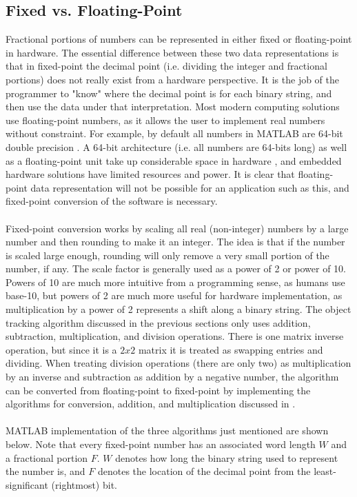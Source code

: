 \documentclass[12pt]{article} %
\begin{document}
\subsection{Fixed vs. Floating-Point}
Fractional portions of numbers can be represented in either fixed or floating-point in hardware. The essential difference between these two data representations is that in fixed-point the decimal point (i.e. dividing the integer and fractional portions) does not really exist from a hardware perspective. It is the job of the programmer to "know" where the decimal point is for each binary string, and then use the data under that interpretation. Most modern computing solutions use floating-point numbers, as it allows the user to implement real numbers without constraint. For example, by default all numbers in MATLAB are 64-bit double precision \cite{10}. A 64-bit architecture (i.e. all numbers are 64-bits long) as well as a floating-point unit take up considerable space in hardware \cite{10}, and embedded hardware solutions have limited resources and power. It is clear that floating-point data representation will not be possible for an application such as this, and fixed-point conversion of the software is necessary. \\\\
Fixed-point conversion works by scaling all real (non-integer) numbers by a large number and then rounding to make it an integer. The idea is that if the number is scaled large enough, rounding will only remove a very small portion of the number, if any. The scale factor is generally used as a power of 2 or power of 10. Powers of 10 are much more intuitive from a programming sense, as humans use base-10, but powers of 2 are much more useful for hardware implementation, as multiplication by a power of 2 represents a shift along a binary string. The object tracking algorithm discussed in the previous sections only uses addition, subtraction, multiplication, and division operations. There is one matrix inverse operation, but since it is a $2x2$ matrix it is treated as swapping entries and dividing. When treating division operations (there are only two) as multiplication by an inverse and subtraction as addition by a negative number, the algorithm can be converted from floating-point to fixed-point by implementing the algorithms for conversion, addition, and multiplication discussed in \cite{10}. \\\\
MATLAB implementation of the three algorithms just mentioned are shown below. Note that every fixed-point number has an associated word length $W$ and a fractional portion $F$. $W$ denotes how long the binary string used to represent the number is, and $F$ denotes the location of the decimal point from the least-significant (rightmost) bit. \\\\
\end{document}
